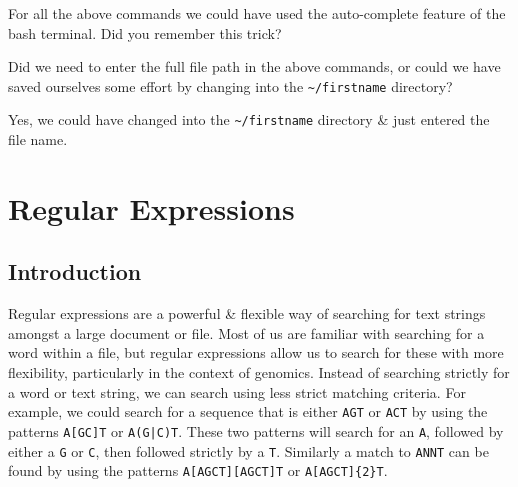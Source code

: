 \documentclass[a4paper,12pt,twoside]{memoir}
\begin{document}
\begin{note}
For all the above commands we could have used the auto-complete feature of the bash terminal.
Did you remember this trick?
\end{note}

\begin{questions}
Did we need to enter the full file path in the above commands, or could we have saved ourselves some effort by changing into the \texttt{\~{}/firstname} directory? \\
\begin{answer}
Yes, we could have changed into the \texttt{\~{}/firstname} directory \& just entered the file name. \\
\end{answer}
\end{questions}

%

\chapter{Regular Expressions}
\section{Introduction}
Regular expressions are a powerful \& flexible way of searching for text strings amongst a large document or file.
Most of us are familiar with searching for a word within a file, but regular expressions allow us to search for these with more flexibility, particularly in the context of genomics.
Instead of searching strictly for a word or text string, we can search using less strict matching criteria.
For example, we could search for a sequence that is either \texttt{AGT} or \texttt{ACT} by using the patterns  \texttt{A[GC]T} or  \texttt{A(G|C)T}.
These two patterns will search for an  \texttt{A}, followed by either a  \texttt{G} or  \texttt{C}, then followed strictly by a  \texttt{T}.
Similarly a match to \texttt{ANNT} can be found by using the patterns \texttt{A[AGCT][AGCT]T} or  \texttt{A[AGCT]\{2\}T}. \\
\end{document}
